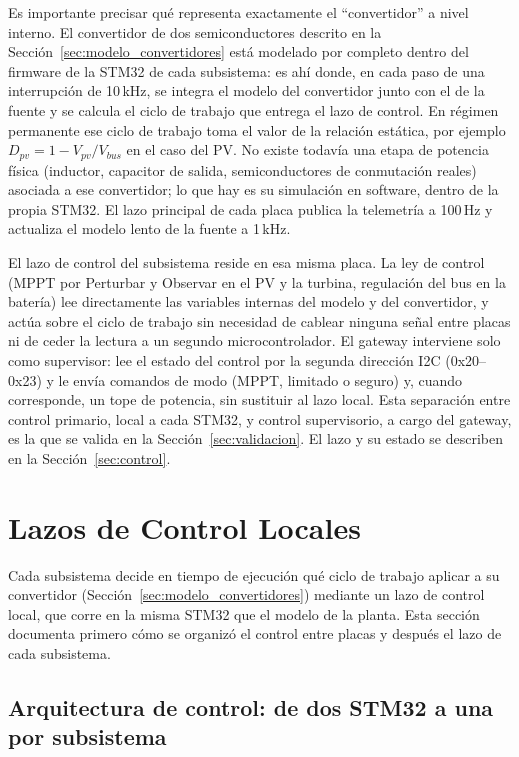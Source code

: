 \documentclass[conference]{IEEEtran}
\begin{document}
Es importante precisar qué representa exactamente el ``convertidor'' a nivel interno. El convertidor de dos semiconductores descrito en la Sección~\ref{sec:modelo_convertidores} está modelado por completo dentro del firmware de la STM32 de cada subsistema: es ahí donde, en cada paso de una interrupción de 10\,kHz, se integra el modelo del convertidor junto con el de la fuente y se calcula el ciclo de trabajo que entrega el lazo de control. En régimen permanente ese ciclo de trabajo toma el valor de la relación estática, por ejemplo $D_{pv}=1-V_{pv}/V_{bus}$ en el caso del PV. No existe todavía una etapa de potencia física (inductor, capacitor de salida, semiconductores de conmutación reales) asociada a ese convertidor; lo que hay es su simulación en software, dentro de la propia STM32. El lazo principal de cada placa publica la telemetría a 100\,Hz y actualiza el modelo lento de la fuente a 1\,kHz.

El lazo de control del subsistema reside en esa misma placa. La ley de control (MPPT por Perturbar y Observar en el PV y la turbina, regulación del bus en la batería) lee directamente las variables internas del modelo y del convertidor, y actúa sobre el ciclo de trabajo sin necesidad de cablear ninguna señal entre placas ni de ceder la lectura a un segundo microcontrolador. El gateway interviene solo como supervisor: lee el estado del control por la segunda dirección I2C (0x20--0x23) y le envía comandos de modo (MPPT, limitado o seguro) y, cuando corresponde, un tope de potencia, sin sustituir al lazo local. Esta separación entre control primario, local a cada STM32, y control supervisorio, a cargo del gateway, es la que se valida en la Sección~\ref{sec:validacion}. El lazo y su estado se describen en la Sección~\ref{sec:control}.

\section{Lazos de Control Locales}
\label{app:control}
\label{sec:control}

Cada subsistema decide en tiempo de ejecución qué ciclo de trabajo aplicar a su convertidor (Sección~\ref{sec:modelo_convertidores}) mediante un lazo de control local, que corre en la misma STM32 que el modelo de la planta. Esta sección documenta primero cómo se organizó el control entre placas y después el lazo de cada subsistema.

\subsection{Arquitectura de control: de dos STM32 a una por subsistema}
\label{sec:control_arquitectura}
\end{document}
